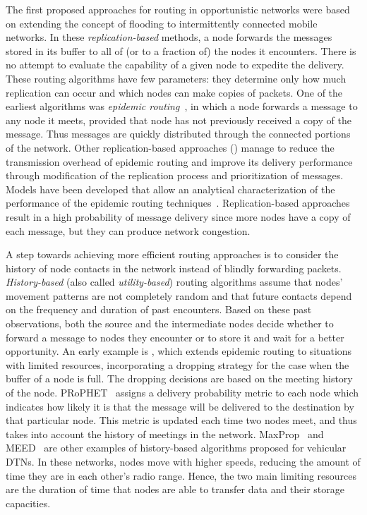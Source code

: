 \documentclass[journal,onecolumn,11pt]{IEEEtran}
\theoremstyle{plain}
\theoremstyle{definition}
\begin{document}
The first proposed approaches for routing in opportunistic networks
were based on extending the concept of flooding to intermittently
connected mobile networks. In these {\em replication-based} methods, a
node forwards the messages stored in its buffer to all of (or to a
fraction of) the nodes it encounters. There is no attempt to evaluate
the capability of a given node to expedite the delivery. These routing
algorithms have few parameters: they determine only how much
replication can occur and which nodes can make copies of packets. One
of the earliest algorithms was {\em epidemic
  routing}~\cite{vahdat2000epidemic}, in which a node forwards a
message to any node it meets, provided that node has not previously
received a copy of the message. Thus messages are quickly distributed
through the connected portions of the network. Other
replication-based approaches (\cite{grossglauser2001mobility,
  spyropoulos2005spray,ramanathan2007prioritized,khouzani2012optimal})
manage to reduce the transmission overhead of epidemic routing and
improve its delivery performance through modification of the
replication process and prioritization of messages. Models have been
developed that allow an analytical characterization of the performance
of the epidemic routing techniques~\cite{klein2010reaction,wang2012analytical}.
Replication-based approaches result in a high probability of
message delivery since more nodes have a copy of each message, but
they can produce network congestion.

A step towards achieving more efficient routing approaches is to
consider the history of node contacts in the network instead of
blindly forwarding packets. {\em History-based} (also called {\em
  utility-based}) routing algorithms assume that nodes' movement
patterns are not completely random and that future contacts depend on
the frequency and duration of past encounters. Based on these past
observations, both the source and the intermediate nodes decide
whether to forward a message to nodes they encounter or to store it
and wait for a better opportunity. An early example is
\cite{davis2001wearable}, which extends epidemic routing to situations
with limited resources, incorporating a dropping strategy for the case when the buffer
of a node is full. The dropping decisions are based on the meeting
history of the node. PRoPHET~\cite{lindgren2003probabilistic} assigns a delivery
probability metric to each node which indicates how likely it is that
the message will be delivered to the destination by that particular
node. This metric is updated each time two nodes meet, and thus takes
into account the history of meetings in the network.
MaxProp~\cite{burgess2006maxprop} and MEED~\cite{jones2007practical}
are other examples of history-based algorithms proposed for vehicular
DTNs. In these networks, nodes move with higher speeds, reducing the
amount of time they are in each other's radio range. Hence, the two
main limiting resources are the duration of time that nodes are able
to transfer data and their storage capacities.
\end{document}
